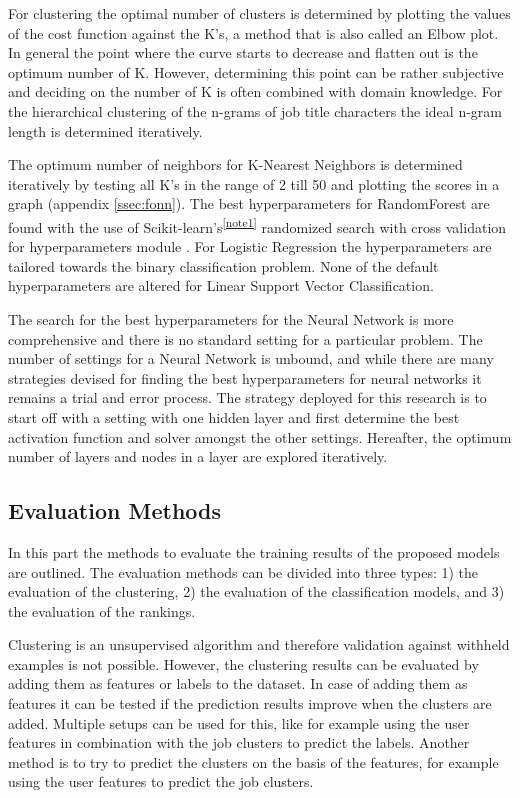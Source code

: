 For clustering the optimal number of clusters is determined by plotting the values of the cost function against the K’s, a method that is also called an Elbow plot.
In general the point where the curve starts to decrease and flatten out is the optimum number of K. 
However, determining this point can be rather subjective and deciding on the number of K is often combined with domain knowledge.
For the hierarchical clustering of the n-grams of job title characters the ideal n-gram length is determined iteratively. 

The optimum number of neighbors for K-Nearest Neighbors is determined iteratively by testing all K’s in the range of 2 till 50 and plotting the scores in a graph (appendix \ref{ssec:fonn}).
The best hyperparameters for RandomForest are found with the use of Scikit-learn’s\textsuperscript{\ref{note1}} randomized search with cross validation for hyperparameters module \cite{ bergstra2012random}.
For Logistic Regression the hyperparameters are tailored towards the binary classification problem. 
None of the default hyperparameters are altered for Linear Support Vector Classification. 

The search for the best hyperparameters for the Neural Network is more comprehensive and there is no standard setting for a particular problem. 
The number of settings for a Neural Network is unbound, and while there are many strategies devised for finding the best hyperparameters for neural networks \cite{larochelle2009exploring} it remains a trial and error process.
The strategy deployed for this research is to start off with a setting with one hidden layer and first determine the best activation function and solver amongst the other settings.
Hereafter, the optimum number of layers and nodes in a layer are explored iteratively.

\subsection{Evaluation Methods}
\label{ssec:eval}
In this part the methods to evaluate the training results of the proposed models are outlined.
The evaluation methods can be divided into three types: 1) the evaluation of the clustering, 2) the evaluation of the classification models, and 3) the evaluation of the rankings.

Clustering is an unsupervised algorithm and therefore validation against withheld examples is not possible.
However, the clustering results can be evaluated by adding them as features or labels to the dataset.
In case of adding them as features it can be tested if the prediction results improve when the clusters are added.
Multiple setups can be used for this, like for example using the user features in combination with the job clusters to predict the labels.
Another method is to try to predict the clusters on the basis of the features, for example using the user features to predict the job clusters. 

